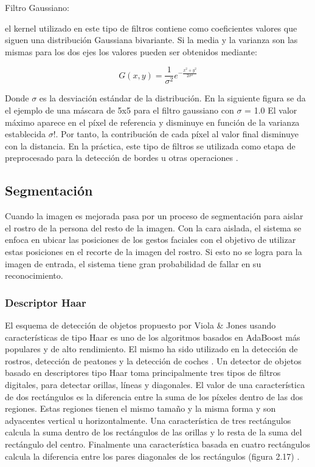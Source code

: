 \begin{enumerate}
\begin{itemize}
\begin{enumerate}
{\bf\item[B.3. ] Filtro Gaussiano:}
el kernel utilizado en este tipo de filtros contiene como coeficientes valores que siguen una distribución Gaussiana bivariante. Si la media y la varianza son las mismas para los dos ejes los valores pueden ser obtenidos mediante:

\begin{equation}
G(x,y)=\frac{1}{\sigma^2}{e^{-\frac{x^2+y^2}{2\sigma^2}}}
\end{equation}

Donde $\sigma$ es la desviación estándar de la distribución. En la siguiente figura se da el ejemplo de una máscara de 5x5 para el filtro gaussiano con $\sigma$ = 1.0 
\vskip 0.1cm
El valor máximo aparece en el píxel de referencia y disminuye en función de la varianza establecida $\sigma$!. Por tanto, la contribución de cada píxel al valor final disminuye con la distancia. En la práctica, este tipo de filtros se utilizada como etapa de preprocesado para la detección de bordes u otras operaciones \citep{Enrique}.

\end{enumerate}

\end{itemize}
\end{enumerate}

\subsection{Segmentación}
Cuando la imagen es mejorada pasa por un proceso de segmentación para aislar el rostro de la persona del resto de la imagen. Con la cara aislada, el sistema se enfoca en ubicar las posiciones de los gestos faciales con el objetivo de utilizar estas posiciones en el recorte de la imagen del rostro. Si esto no se logra para la imagen de entrada, el sistema tiene gran probabilidad de fallar en su reconocimiento.

\subsubsection{Descriptor Haar}
El esquema de detección de objetos propuesto por Viola \& Jones usando características de tipo Haar es uno de los algoritmos basados en AdaBoost más populares y de alto rendimiento. El mismo ha sido utilizado en la detección de rostros, detección de peatones y la detección de coches \citep{Fernando}.
\vskip 0.1cm
Un detector de objetos basado en descriptores tipo Haar toma principalmente tres tipos de filtros digitales, para detectar orillas, líneas y diagonales. El valor de una característica de dos rectángulos es la diferencia entre la suma de los píxeles dentro de las dos regiones. Estas regiones tienen el mismo tamaño y la misma forma y son adyacentes vertical u horizontalmente. Una característica de tres rectángulos calcula la suma dentro de los rectángulos de las orillas y lo resta de la suma del rectángulo del centro. Finalmente una característica basada en cuatro rectángulos calcula la diferencia entre los pares diagonales de los rectángulos (figura 2.17) \citep{Lopez}.

